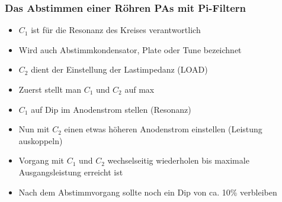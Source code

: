\begin{frame}
\frametitle{Das Abstimmen einer Röhren PAs mit Pi-Filtern}
\begin{center}
\begin{itemize}
	\item	$C_1$ ist für die Resonanz des Kreises verantwortlich
	\item	Wird auch Abstimmkondensator, Plate oder Tune bezeichnet
	\item	$C_2$ dient der Einstellung der Lastimpedanz (LOAD)
	\item	Zuerst stellt man $C_1$ und $C_2$ auf max
	\item	$C_1$ auf Dip im Anodenstrom stellen (Resonanz)
	\item	Nun mit $C_2$ einen etwas höheren Anodenstrom einstellen (Leistung auskoppeln)
	\item	Vorgang mit $C_1$ und $C_2$ wechselseitig wiederholen bis maximale Ausgangsleistung erreicht ist
	\item	Nach dem Abstimmvorgang sollte noch ein Dip von ca. 10\% verbleiben 
\end{itemize}
\end{center}
\end{frame}

